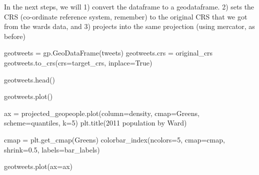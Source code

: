 \documentclass[
  letterpaper,
  DIV=11,
  numbers=noendperiod]{scrreprt}
\newenvironment{Shaded}{\begin{snugshade}}{\end{snugshade}}
\newcommand{\DecValTok}[1]{\textcolor[rgb]{0.68,0.00,0.00}{#1}}
\newcommand{\FloatTok}[1]{\textcolor[rgb]{0.68,0.00,0.00}{#1}}
\newcommand{\NormalTok}[1]{\textcolor[rgb]{0.00,0.23,0.31}{#1}}
\newcommand{\OperatorTok}[1]{\textcolor[rgb]{0.37,0.37,0.37}{#1}}
\newcommand{\StringTok}[1]{\textcolor[rgb]{0.13,0.47,0.30}{#1}}
\newcommand{\VariableTok}[1]{\textcolor[rgb]{0.07,0.07,0.07}{#1}}
\begin{document}
In the next steps, we will 1) convert the dataframe to a geodataframe.
2) sets the CRS (co-ordinate reference system, remember) to the original
CRS that we got from the wards data, and 3) projects into the same
projection (using mercator, as before)

\begin{Shaded}
\begin{Highlighting}[]
\NormalTok{geotweets }\OperatorTok{=}\NormalTok{ gp.GeoDataFrame(tweets)}
\NormalTok{geotweets.crs }\OperatorTok{=}\NormalTok{ original\_crs}
\NormalTok{geotweets.to\_crs(crs}\OperatorTok{=}\NormalTok{target\_crs, inplace}\OperatorTok{=}\VariableTok{True}\NormalTok{)}
\end{Highlighting}
\end{Shaded}

\begin{Shaded}
\begin{Highlighting}[]
\NormalTok{geotweets.head()}
\end{Highlighting}
\end{Shaded}

\begin{Shaded}
\begin{Highlighting}[]
\NormalTok{geotweets.plot()}
\end{Highlighting}
\end{Shaded}

\begin{Shaded}
\begin{Highlighting}[]
\NormalTok{ax }\OperatorTok{=}\NormalTok{ projected\_geopeople.plot(column}\OperatorTok{=}\StringTok{\textquotesingle{}density\textquotesingle{}}\NormalTok{, cmap}\OperatorTok{=}\StringTok{\textquotesingle{}Greens\textquotesingle{}}\NormalTok{, scheme}\OperatorTok{=}\StringTok{\textquotesingle{}quantiles\textquotesingle{}}\NormalTok{, k}\OperatorTok{=}\DecValTok{5}\NormalTok{)}
\NormalTok{plt.title(}\StringTok{\textquotesingle{}2011 population by Ward\textquotesingle{}}\NormalTok{)}

\NormalTok{cmap }\OperatorTok{=}\NormalTok{ plt.get\_cmap(}\StringTok{\textquotesingle{}Greens\textquotesingle{}}\NormalTok{)}
\NormalTok{colorbar\_index(ncolors}\OperatorTok{=}\DecValTok{5}\NormalTok{, cmap}\OperatorTok{=}\NormalTok{cmap, shrink}\OperatorTok{=}\FloatTok{0.5}\NormalTok{, labels}\OperatorTok{=}\NormalTok{bar\_labels)}

\NormalTok{geotweets.plot(ax}\OperatorTok{=}\NormalTok{ax)}
\end{Highlighting}
\end{Shaded}
\end{document}
